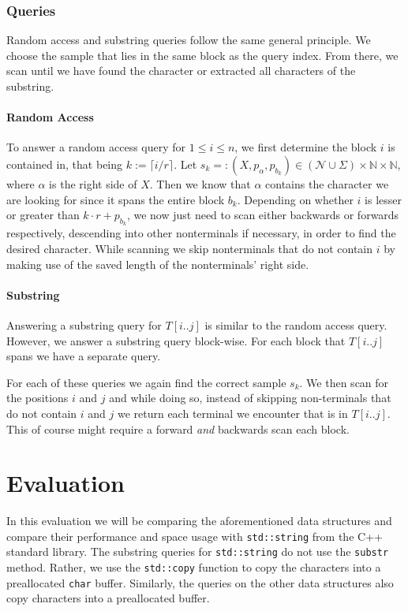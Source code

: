 \documentclass{scrartcl}
\begin{document}
\subsubsection{Queries}

Random access and substring queries follow the same general principle.
We choose the sample that lies in the same block as the query index.
From there, we scan until we have found the character or extracted all characters of the substring.

\paragraph{Random Access}

To answer a random access query for $1 \leq i \leq n$, we first determine the block $i$ is contained in, that being $k := \lceil i/r \rceil$.
Let $s_k =: (X, p_{\alpha}, p_{b_k}) \in (\mathcal{N} \cup \Sigma) \times \mathbb{N} \times \mathbb{N}$, where $\alpha$ is the right side of $X$.
Then we know that $\alpha$ contains the character we are looking for since it spans the entire block $b_k$.
Depending on whether $i$ is lesser or greater than $k \cdot r + p_{b_k}$, we now just need to scan either backwards or forwards respectively,
descending into other nonterminals if necessary, in order to find the desired character.
While scanning we skip nonterminals that do not contain $i$ by making use of the saved length of the nonterminals' right side.

\paragraph{Substring}

Answering a substring query for $T[i..j]$ is similar to the random access query.
However, we answer a substring query block-wise. For each block that $T[i..j]$ spans we have a separate query.

For each of these queries we again find the correct sample $s_k$.
We then scan for the positions $i$ and $j$ and while doing so, instead of skipping non-terminals that do not contain $i$ and $j$
we return each terminal we encounter that is in $T[i..j]$.
This of course might require a forward \emph{and} backwards scan each block.

\section{Evaluation}

In this evaluation we will be comparing the aforementioned data structures and compare their performance and space usage with \texttt{std::string} from the C++ standard library.
The substring queries for \texttt{std::string} do not use the \texttt{substr} method.
Rather, we use the \texttt{std::copy} function to copy the characters into a preallocated \texttt{char} buffer.
Similarly, the queries on the other data structures also copy characters into a preallocated buffer.
\end{document}
